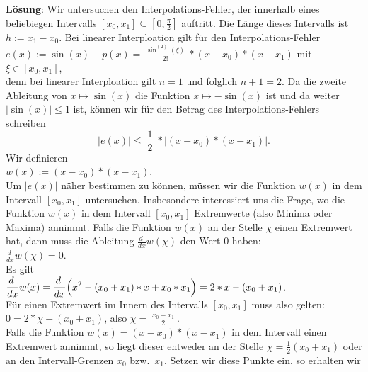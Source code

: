 \documentclass{article}
\newcommand{\bruch}[2]{\displaystyle\frac{\;\displaystyle#1\;}{\;\displaystyle#2\;}}
\newcommand{\df}{\displaystyle\frac{d\;}{dx}}
\begin{document}
\noindent
\textbf{L\"osung}:  
Wir untersuchen den Interpolations-Fehler, der innerhalb eines beliebiegen Intervalls 
$[x_0, x_1] \subseteq [0,\frac{\pi}{2}]$ auftritt.  Die L\"ange dieses Intervalls ist $h := x_1 - x_0$.
Bei linearer Interploation gilt f\"ur den Interpolations-Fehler
\\[0.1cm]
\hspace*{1.3cm}
$e(x) := \sin(x) - p(x) = \bruch{\sin^{(2)}(\xi)}{2!} * (x-x_0)*(x - x_1)$ \quad mit $\xi\in [x_0,x_1]$,
\\[0.3cm]
denn bei linearer Interploation gilt $n=1$ und folglich $n+1 = 2$.
Da die zweite Ableitung von $x \mapsto \sin(x)$ die Funktion $x \mapsto -\sin(x)$ ist und
da weiter $|\sin(x)| \leq 1$ ist, k\"onnen wir f\"ur den Betrag des Interpolations-Fehlers 
schreiben
\begin{equation}
  \label{eq:interpolationSinus}
|e(x)| \leq \bruch{1}{2} * |(x-x_0)*(x-x_1)|. 
\end{equation}
Wir definieren 
\\[0.1cm]
\hspace*{1.3cm} $w(x) := (x-x_0)*(x-x_1)$. 
\\[0.1cm]
Um $|e(x)|$ n\"aher bestimmen zu k\"onnen, m\"ussen wir die Funktion $w(x)$ in dem Intervall
$[x_0,x_1]$ untersuchen.  Insbesondere interessiert uns die Frage, wo die Funktion $w(x)$
in dem Intervall $[x_0,x_1]$ Extremwerte (also Minima oder Maxima) annimmt.  Falls
die Funktion $w(x)$ an der Stelle $\chi$ einen  Extremwert hat, dann muss die Ableitung
$\df w(\chi)$ den Wert 0 haben: 
\\[0.1cm]
\hspace*{1.3cm}
$\df w(\chi) = 0$.
\\[0.1cm]
Es gilt 
\\[0.1cm]
\hspace*{1.3cm}
$\df w(x) = \df \Bigl( x^2 - (x_0 + x_1) * x + x_0 * x_1\Bigr) = 2*x - (x_0 + x_1)$.
\\[0.3cm]
F\"ur einen Extremwert im Innern des Intervalls $[x_0,x_1]$ muss also gelten:
\\[0.3cm]
\hspace*{1.3cm}
$0 = 2 * \chi - (x_0 + x_1)$, \quad also \quad $\chi = \bruch{x_0 + x_1}{2}$.
\\[0.3cm]
Falls die Funktion $w(x) = (x - x_0)*(x - x_1)$ in dem Intervall einen Extremwert annimmt,
so liegt dieser entweder an der Stelle $\chi = \frac{1}{2}(x_0 + x_1)$ oder an den
Intervall-Grenzen $x_0$ bzw.~$x_1$.  Setzen wir diese Punkte ein, so erhalten wir 
\\[0.1cm]
\end{document}
